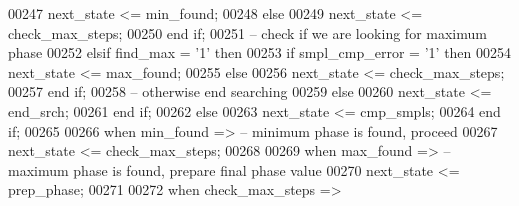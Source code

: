 \begin{DoxyCode}
00247                   \textcolor{vhdlchar}{next_state} \textcolor{vhdlchar}{<=} \textcolor{vhdlchar}{min\_found};
00248                \textcolor{keywordflow}{else} 
00249                   \textcolor{vhdlchar}{next_state} \textcolor{vhdlchar}{<=} \textcolor{vhdlchar}{check\_max\_steps};
00250                \textcolor{keywordflow}{end} \textcolor{keywordflow}{if};
00251 \textcolor{keyword}{            -- check if we are looking for maximum phase}
00252             \textcolor{keywordflow}{elsif} \textcolor{vhdlchar}{find_max} \textcolor{vhdlchar}{=} \textcolor{vhdlchar}{'}\textcolor{vhdllogic}{}\textcolor{vhdllogic}{1}\textcolor{vhdlchar}{'} \textcolor{keywordflow}{then}  
00253                \textcolor{keywordflow}{if} \textcolor{vhdlchar}{smpl_cmp_error} \textcolor{vhdlchar}{=} \textcolor{vhdlchar}{'}\textcolor{vhdllogic}{}\textcolor{vhdllogic}{1}\textcolor{vhdlchar}{'} \textcolor{keywordflow}{then}
00254                   \textcolor{vhdlchar}{next_state} \textcolor{vhdlchar}{<=} \textcolor{vhdlchar}{max\_found};
00255                \textcolor{keywordflow}{else} 
00256                   \textcolor{vhdlchar}{next_state} \textcolor{vhdlchar}{<=} \textcolor{vhdlchar}{check\_max\_steps};
00257                \textcolor{keywordflow}{end} \textcolor{keywordflow}{if};
00258 \textcolor{keyword}{            -- otherwise end searching}
00259             \textcolor{keywordflow}{else}  
00260                \textcolor{vhdlchar}{next_state} \textcolor{vhdlchar}{<=} \textcolor{vhdlchar}{end\_srch};
00261             \textcolor{keywordflow}{end} \textcolor{keywordflow}{if};
00262          \textcolor{keywordflow}{else} 
00263             \textcolor{vhdlchar}{next_state} \textcolor{vhdlchar}{<=} \textcolor{vhdlchar}{cmp\_smpls};
00264          \textcolor{keywordflow}{end} \textcolor{keywordflow}{if};
00265          
00266       \textcolor{keywordflow}{when} \textcolor{vhdlchar}{min\_found} \textcolor{vhdlchar}{=}\textcolor{vhdlchar}{>}\textcolor{keyword}{       -- minimum phase is found, proceed}
00267          \textcolor{vhdlchar}{next_state} \textcolor{vhdlchar}{<=} \textcolor{vhdlchar}{check\_max\_steps};
00268          
00269       \textcolor{keywordflow}{when} \textcolor{vhdlchar}{max\_found} \textcolor{vhdlchar}{=}\textcolor{vhdlchar}{>}\textcolor{keyword}{       -- maximum phase is found, prepare final phase value}
00270          \textcolor{vhdlchar}{next_state} \textcolor{vhdlchar}{<=} \textcolor{vhdlchar}{prep\_phase};
00271          
00272       \textcolor{keywordflow}{when} \textcolor{vhdlchar}{check\_max\_steps} \textcolor{vhdlchar}{=}\textcolor{vhdlchar}{>}

\end{DoxyCode}
